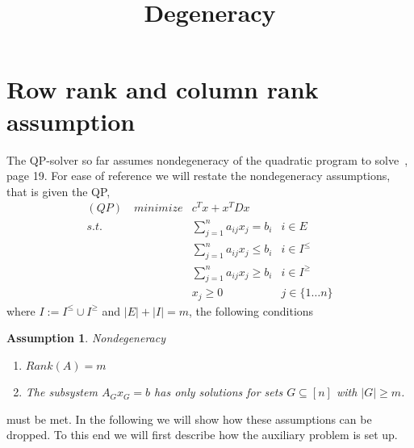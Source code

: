 \documentclass[a4paper]{article}
\title{Degeneracy}
\author{}
\newtheorem{assumption}{Assumption}
\begin{document}
\maketitle
\section{Row rank and column rank assumption}
The QP-solver so far assumes nondegeneracy of the quadratic program to
solve~\cite{Sven}, page 19. For ease of reference we will restate the
nondegeneracy assumptions, that is given the QP,
\begin{eqnarray}
\label{def:QP}
(QP)\quad minimize&  c^{T}x + x^{T} D x      	&  \nonumber \\
s.t.	 & \sum_{j=1}^{n}a_{ij}x_{j} = b_{i}	& i \in E  \nonumber \\
	 & \sum_{j=1}^{n}a_{ij}x_{j} \leq b_{i} & i \in I^{\leq} \\
	 & \sum_{j=1}^{n}a_{ij}x_{j} \geq b_{i} & i \in I^{\geq}  \nonumber \\
 	 & x_{j} \geq 0				& j \in \{1 \ldots n \}
	 \nonumber
\end{eqnarray}
where $I:= I^{\leq} \cup I^{\geq}$ and
$\left| E \right| + \left| I \right| = m$,
the following conditions
\begin{assumption} \label{ass:nondegeneracy}
Nondegeneracy

\begin{enumerate}
\item $Rank\left( A \right) = m$
\item The subsystem $A_{G}x_{G} = b$ has only solutions for sets $G \subseteq
\left[ n \right]$ with $\left|G \right| \geq m$.
\end{enumerate}
\end{assumption}
must be met. In the following we will show how these
assumptions can be dropped. To this end we will first describe how the auxiliary
problem is set up. 
\end{document}
